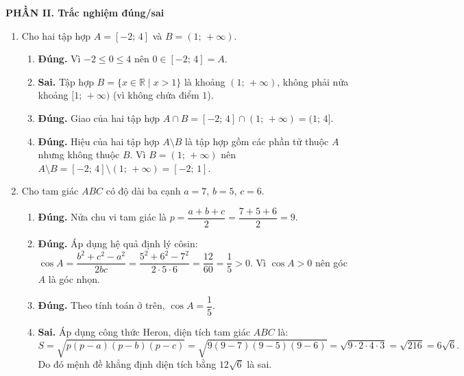 \documentclass[12pt,a4paper]{article}
\begin{document}
\vspace{0.3cm}
\textbf{\large PHẦN II. Trắc nghiệm đúng/sai}
\begin{enumerate}[label=\textbf{Câu \arabic*.},leftmargin=1.1cm]
\item 
Cho hai tập hợp $A = [-2;\, 4]$ và $B = (1;\, +\infty)$.
\begin{enumerate}
    \item \textbf{Đúng.} Vì $-2 \le 0 \le 4$ nên $0 \in [-2;\, 4] = A$.
    \item \textbf{Sai.} Tập hợp $B = \{x \in \mathbb{R} \mid x > 1\}$ là khoảng $(1;\, +\infty)$, không phải nửa khoảng $[1;\, +\infty)$ (vì không chứa điểm $1$).
    \item \textbf{Đúng.} Giao của hai tập hợp $A \cap B = [-2;\, 4] \cap (1;\, +\infty) = (1;\, 4]$.
    \item \textbf{Đúng.} Hiệu của hai tập hợp $A \setminus B$ là tập hợp gồm các phần tử thuộc $A$ nhưng không thuộc $B$. Vì $B = (1;\, +\infty)$ nên $A \setminus B = [-2;\, 4] \setminus (1;\, +\infty) = [-2;\, 1]$.
\end{enumerate}

\item 
Cho tam giác $ABC$ có độ dài ba cạnh $a = 7$, $b = 5$, $c = 6$.
\begin{enumerate}
    \item \textbf{Đúng.} Nửa chu vi tam giác là $p = \dfrac{a + b + c}{2} = \dfrac{7 + 5 + 6}{2} = 9$.
    \item \textbf{Đúng.} Áp dụng hệ quả định lý côsin: $\cos A = \dfrac{b^2 + c^2 - a^2}{2bc} = \dfrac{5^2 + 6^2 - 7^2}{2 \cdot 5 \cdot 6} = \dfrac{12}{60} = \dfrac{1}{5} > 0$. Vì $\cos A > 0$ nên góc $A$ là góc nhọn.
    \item \textbf{Đúng.} Theo tính toán ở trên, $\cos A = \dfrac{1}{5}$.
    \item \textbf{Sai.} Áp dụng công thức Heron, diện tích tam giác $ABC$ là:
    \[
    S = \sqrt{p(p - a)(p - b)(p - c)} = \sqrt{9(9 - 7)(9 - 5)(9 - 6)} = \sqrt{9 \cdot 2 \cdot 4 \cdot 3} = \sqrt{216} = 6\sqrt{6}.
    \]
    Do đó mệnh đề khẳng định diện tích bằng $12\sqrt{6}$ là sai.
\end{enumerate}
\end{enumerate}
\end{document}
